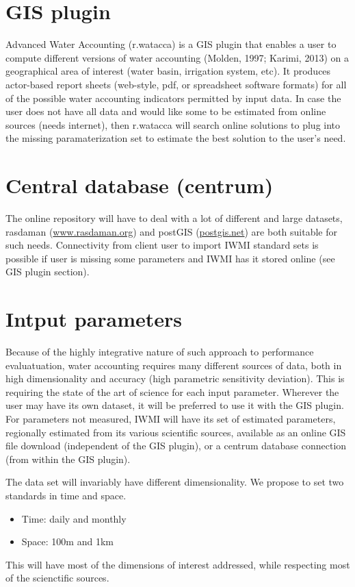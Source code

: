 \documentclass[a4paper,10pt,onecolumn]{article}
\begin{document}
\section{GIS plugin}
Advanced Water Accounting (r.watacca) is a GIS plugin that enables a user to compute different versions of water accounting
(Molden, 1997; Karimi, 2013) on a geographical area of interest (water basin, irrigation system, etc). It produces 
actor-based report sheets (web-style, pdf, or spreadsheet software formats) for all of the possible water accounting
indicators permitted by input data. In case the user does not have all data and would like some to be estimated from 
online sources (needs internet), then r.watacca will search online solutions to plug into the missing paramaterization
set to estimate the best solution to the user's need.

\section{Central database (centrum)}
The online repository will have to deal with a lot of different and large datasets, rasdaman 
(\href{http://www.rasdaman.org}{www.rasdaman.org}) and postGIS (\href{http://postgis.net/}{postgis.net}) are both suitable
for such needs. Connectivity from client user to import IWMI standard sets is possible if user is missing some parameters 
and IWMI has it stored online (see GIS plugin section).

\section{Intput parameters}
Because of the highly integrative nature of such approach to performance evaluatuation, water accounting requires many 
different sources of data, both in high dimensionality and accuracy (high parametric sensitivity deviation). This is 
requiring the state of the art of science for each input parameter. Wherever the user may have its own dataset,
it will be preferred to use it with the GIS plugin. For parameters not measured, IWMI will have its set of estimated
parameters, regionally estimated from its various scientific sources, available as an online GIS file download (independent
of the GIS plugin), or a centrum database connection (from within the GIS plugin). \newline

The data set will invariably have different dimensionality. We propose to set two standards in time and space.
\begin{itemize}
 \item Time: daily and monthly
 \item Space: 100m and 1km
\end{itemize}
This will have most of the dimensions of interest addressed, while respecting most of the scienctific sources.
\end{document}
